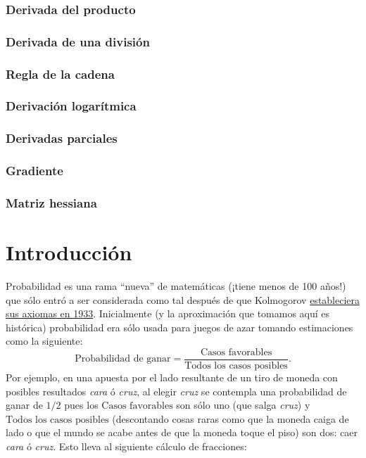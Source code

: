 \documentclass[
]{book}
\begin{document}
\hypertarget{derivada-del-producto}{%
\subsection{Derivada del producto}\label{derivada-del-producto}}

\hypertarget{derivada-de-una-divisiuxf3n}{%
\subsection{Derivada de una división}\label{derivada-de-una-divisiuxf3n}}

\hypertarget{regla-de-la-cadena}{%
\subsection{Regla de la cadena}\label{regla-de-la-cadena}}

\hypertarget{derivaciuxf3n-logaruxedtmica}{%
\subsection{Derivación logarítmica}\label{derivaciuxf3n-logaruxedtmica}}

\hypertarget{derivadas-parciales}{%
\subsection{Derivadas parciales}\label{derivadas-parciales}}

\hypertarget{gradiente}{%
\subsection{Gradiente}\label{gradiente}}

\hypertarget{matriz-hessiana}{%
\subsection{Matriz hessiana}\label{matriz-hessiana}}

\hypertarget{intro}{%
\chapter{Introducción}\label{intro}}

Probabilidad es una rama ``nueva'' de matemáticas (¡tiene menos de 100 años!) que sólo entró a ser considerada como tal después de que Kolmogorov \href{https://link.springer.com/article/10.1007/BF00348144}{estableciera sus axiomas en 1933}. Inicialmente (y la aproximación que tomamos aquí es histórica) probabilidad era sólo usada para juegos de azar tomando estimaciones como la siguiente:
\[
\text{Probabilidad de ganar} = \dfrac{\text{Casos favorables}}{\text{Todos los casos posibles}}.
\]
Por ejemplo, en una apuesta por el lado resultante de un tiro de moneda con posibles resultados \emph{cara} ó \emph{cruz}, al elegir \emph{cruz} se contempla una probabilidad de ganar de \(1/2\) pues los \(\text{Casos favorables}\) son sólo uno (que salga \emph{cruz}) y \(\text{Todos los casos posibles}\) (descontando cosas raras como que la moneda caiga de lado o que el mundo se acabe antes de que la moneda toque el piso) son dos: caer \emph{cara} ó \emph{cruz}. Esto lleva al siguiente cálculo de fracciones:
\end{document}
